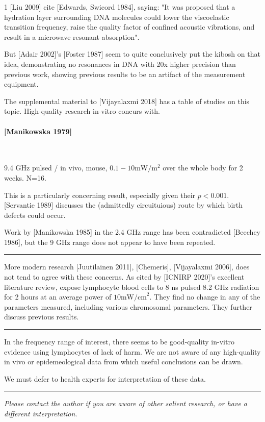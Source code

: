 \documentclass[fleqn,10pt]{article}
\begin{document}
\begin{multicols}{1}
[Liu 2009] cite [Edwards, Swicord 1984], saying: "It was proposed that a hydration layer surrounding DNA molecules could lower the viscoelastic transition
frequency, raise the quality factor of confined acoustic vibrations, and result in a microwave resonant absorption". 

But [Adair 2002]'s [Foster 1987] seem to quite conclusively put the kibosh on that idea, demonstrating no resonances in DNA with 20x higher precision than previous work, showing previous results to be an artifact of the measurement equipment.

The supplemental material to [Vijayalaxmi 2018] has a table of studies on this topic. High-quality research in-vitro concurs with.

\paragraph{[Manikowska 1979]} \

9.4 GHz pulsed / in vivo, mouse, $0.1-10 \text{mW}/\text{m}^2$ over the whole body for 2 weeks. N=16.

This is a particularly concerning result, especially given their $p<0.001$. [Servantie 1989] discusses the (admittedly circuituious) route by which birth defects could occur.

Work by [Manikowska 1985] in the 2.4 GHz range has been contradicted [Beechey 1986], but the 9 GHz range does not appear to have been repeated.

\rule{\linewidth}{0.2pt}

More modern research [Juutilainen 2011], [Chemeris], [Vijayalaxmi 2006],  does not tend to agree with these concerns. As cited by [ICNIRP 2020]'s excellent literature review, expose lymphocyte blood cells to 8 ns pulsed 8.2 GHz radiation for 2 hours at an average power of $10 \text{mW/cm}^2$. They find no change in any of the parameters measured, including various chromosomal parameters. They further discuss previous results.

\rule{\linewidth}{0.2pt}

In the frequency range of interest, there seems to be good-quality in-vitro evidence using lymphocytes of lack of harm. We are not aware of any high-quality in vivo or epidemeological data from which useful conclusions can be drawn. 

We must defer to health experts for interpretation of these data.

\rule{\linewidth}{0.2pt}

{\it Please contact the author if you are aware of other salient research, or have a different interpretation.}


\end{multicols}
\end{document}
